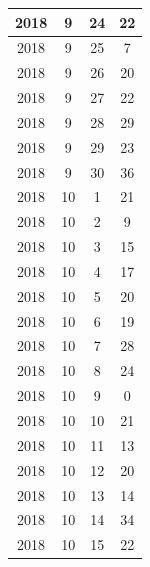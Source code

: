 \begin{longtable} {|c|c|c|c|}
\hline
2018         & 9            & 24           & 22                        \\ 
\hline
2018         & 9            & 25           & 7                         \\ 
\hline
2018         & 9            & 26           & 20                        \\ 
\hline
2018         & 9            & 27           & 22                        \\ 
\hline
2018         & 9            & 28           & 29                        \\ 
\hline
2018         & 9            & 29           & 23                        \\ 
\hline
2018         & 9            & 30           & 36                        \\ 
\hline
2018         & 10           & 1            & 21                        \\ 
\hline
2018         & 10           & 2            & 9                         \\ 
\hline
2018         & 10           & 3            & 15                        \\ 
\hline
2018         & 10           & 4            & 17                        \\ 
\hline
2018         & 10           & 5            & 20                        \\ 
\hline
2018         & 10           & 6            & 19                        \\ 
\hline
2018         & 10           & 7            & 28                        \\ 
\hline
2018         & 10           & 8            & 24                        \\ 
\hline
2018         & 10           & 9            & 0                         \\ 
\hline
2018         & 10           & 10           & 21                        \\ 
\hline
2018         & 10           & 11           & 13                        \\ 
\hline
2018         & 10           & 12           & 20                        \\ 
\hline
2018         & 10           & 13           & 14                        \\ 
\hline
2018         & 10           & 14           & 34                        \\ 
\hline
2018         & 10           & 15           & 22                        \\ 

\end{longtable}
